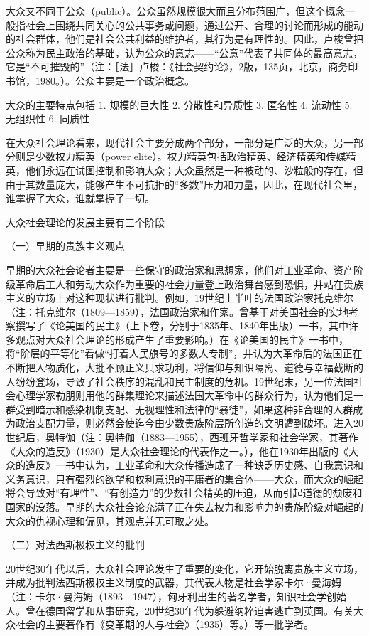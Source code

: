 \documentclass[UTF8,12pt]{ctexart}
\numberwithin{equation}{section} %
\numberwithin{figure}{section}
\numberwithin{table}{section}
\begin{document}
	大众又不同于公众（public）。公众虽然规模很大而且分布范围广，但这个概念一般指社会上围绕共同关心的公共事务或问题，通过公开、合理的讨论而形成的能动的社会群体，他们是社会公共利益的维护者，其行为是有理性的。因此，卢梭曾把公众称为民主政治的基础，认为公众的意志——“公意”代表了共同体的最高意志，它是“不可摧毁的”（注：［法］卢梭：《社会契约论》，2版，135页，北京，商务印书馆，1980。）。公众主要是一个政治概念。
	
	大众的主要特点包括
	1. 规模的巨大性
	2. 分散性和异质性
	3. 匿名性
	4. 流动性
	5. 无组织性
	6. 同质性
	
	在大众社会理论看来，现代社会主要分成两个部分，一部分是广泛的大众，另一部分则是少数权力精英（power elite）。权力精英包括政治精英、经济精英和传媒精英，他们永远在试图控制和影响大众；大众虽然是一种被动的、沙粒般的存在，但由于其数量庞大，能够产生不可抗拒的“多数”压力和力量，因此，在现代社会里，谁掌握了大众，谁就掌握了一切。
	
	大众社会理论的发展主要有三个阶段
	
	（一）早期的贵族主义观点
	
	早期的大众社会论者主要是一些保守的政治家和思想家，他们对工业革命、资产阶级革命后工人和劳动大众作为重要的社会力量登上政治舞台感到恐惧，并站在贵族主义的立场上对这种现状进行批判。例如，19世纪上半叶的法国政治家托克维尔（注：托克维尔（1809—1859），法国政治家和作家。曾基于对美国社会的实地考察撰写了《论美国的民主》（上下卷，分别于1835年、1840年出版）一书，其中许多观点对大众社会理论的形成产生了重要影响。）在《论美国的民主》一书中，将“阶层的平等化”看做“打着人民旗号的多数人专制”，并认为大革命后的法国正在不断把人物质化，大批不顾正义只求功利，将信仰与知识隔离、道德与幸福截断的人纷纷登场，导致了社会秩序的混乱和民主制度的危机。19世纪末，另一位法国社会心理学家勒朋则用他的群集理论来描述法国大革命中的群众行为，认为他们是一群受到暗示和感染机制支配、无视理性和法律的“暴徒”，如果这种非合理的人群成为政治支配力量，则必然会使迄今由少数贵族阶层所创造的文明遭到破坏。进入20世纪后，奥特伽（注：奥特伽（1883—1955），西班牙哲学家和社会学家，其著作《大众的造反》（1930）是大众社会理论的代表作之一。），他在1930年出版的《大众的造反》一书中认为，工业革命和大众传播造成了一种缺乏历史感、自我意识和义务意识，只有强烈的欲望和权利意识的平庸者的集合体——大众，而大众的崛起将会导致对“有理性”、“有创造力”的少数社会精英的压迫，从而引起道德的颓废和国家的没落。早期的大众社会论充满了正在失去权力和影响力的贵族阶级对崛起的大众的仇视心理和偏见，其观点并无可取之处。
	
	（二）对法西斯极权主义的批判
	
	20世纪30年代以后，大众社会理论发生了重要的变化，它开始脱离贵族主义立场，并成为批判法西斯极权主义制度的武器，其代表人物是社会学家卡尔·曼海姆（注：卡尔·曼海姆（1893—1947），匈牙利出生的著名学者，知识社会学创始人。曾在德国留学和从事研究，20世纪30年代为躲避纳粹迫害逃亡到英国。有关大众社会的主要著作有《变革期的人与社会》（1935）等。）等一批学者。
	
\end{document}

